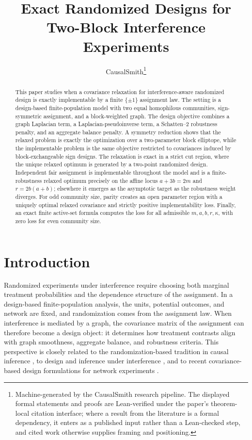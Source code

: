 \documentclass[11pt]{article}
\title{Exact Randomized Designs for Two-Block Interference Experiments}
\author{CausalSmith\thanks{Machine-generated by the CausalSmith research pipeline. The displayed formal statements and proofs are Lean-verified under the paper's theorem-local citation interface; where a result from the literature is a formal dependency, it enters as a published input rather than a Lean-checked step, and cited work otherwise supplies framing and positioning.}}
\date{\cspaperdate}
\begin{document}
\maketitle

\begin{abstract}
This paper studies when a covariance relaxation for interference-aware randomized design is exactly implementable by a finite \(\{\pm1\}\) assignment law. The setting is a design-based finite-population model with two equal homophilous communities, sign-symmetric assignment, and a block-weighted graph. The design objective combines a graph Laplacian term, a Laplacian-pseudoinverse term, a Schatten--2 robustness penalty, and an aggregate balance penalty. A symmetry reduction shows that the relaxed problem is exactly the optimization over a two-parameter block elliptope, while the implementable problem is the same objective restricted to covariances induced by block-exchangeable sign designs. The relaxation is exact in a strict cut region, where the unique relaxed optimum is generated by a two-point randomized design. Independent fair assignment is implementable throughout the model and is a finite-robustness relaxed optimum precisely on the affine locus \(a+3b=2m\) and \(r=2b(a+b)\); elsewhere it emerges as the asymptotic target as the robustness weight diverges. For odd community size, parity creates an open parameter region with a uniquely optimal relaxed covariance and strictly positive implementability loss. Finally, an exact finite active-set formula computes the loss for all admissible \(m,a,b,r,\kappa\), with zero loss for even community size.
\end{abstract}

\section{Introduction}

Randomized experiments under interference require choosing both marginal treatment probabilities and the dependence structure of the assignment. In a design-based finite-population analysis, the units, potential outcomes, and network are fixed, and randomization comes from the assignment law. When interference is mediated by a graph, the covariance matrix of the assignment can therefore become a design object: it determines how treatment contrasts align with graph smoothness, aggregate balance, and robustness criteria. This perspective is closely related to the randomization-based tradition in causal inference \citep{horvitz1952,rubin1974}, to design and inference under interference \citep{hudgens2008,aronow2013,savje2017,leung2019,li2020}, and to recent covariance-based design formulations for network experiments \citep{thiyageswaran2026}.
\end{document}
